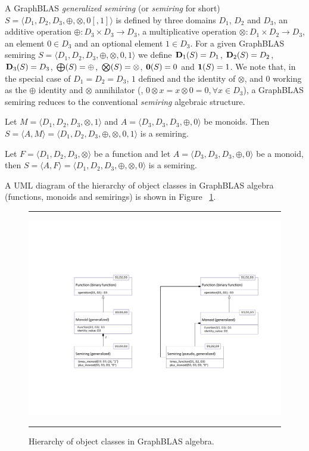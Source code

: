 \documentclass[11pt]{extarticle}
\begin{document}
A GraphBLAS \emph{generalized semiring} (or \emph{semiring} for short)
$S=\langle D_1,D_2,D_3,\oplus,\otimes,0 [,1] \rangle$ is defined by
three domains $D_1$, $D_2$ and $D_3$, an additive operation $\oplus :
D_3 \times D_3 \rightarrow D_3$, 
a multiplicative operation $\otimes : D_1 \times D_2 \rightarrow
D_3$, an element $0 \in D_3$ and an optional element $1 \in D_3$.
For a given GraphBLAS semiring $S=\langle D_1,
D_2, D_3,\oplus,\otimes,0,1 \rangle$ we define $\bold{D}_1(S) = D_1$,
$\bold{D}_2(S) = D_2$, $\bold{D}_3(S) = D_3$, $\bold{\bigoplus}(S) =
\oplus$, $\bold{\bigotimes}(S) = \otimes$, ${\bf 0}(S) = 0$ and ${\bf 1}(S) =
1$. We note that, in the special case of $D_1 = D_2 = D_3$, $1$ defined and the identity of $\otimes$,
and $0$ working as the $\oplus$ identity and $\otimes$ annihilator (\ie, $0 \otimes x = x
\otimes 0 = 0, \forall x \in D_3$), a GraphBLAS semiring reduces to the
conventional \emph{semiring} algebraic structure.

Let $M = \langle D_1,D_2,D_3,\otimes,1 \rangle$ and
$A = \langle D_3,D_3,D_3,\oplus,0 \rangle$ be monoids.
Then $S= \langle A,M \rangle = \langle D_1,D_2,D_3,\oplus,\otimes,0,1 \rangle$
is a semiring.

Let $F = \langle D_1,D_2,D_3,\otimes \rangle$ be a function
and let $A = \langle D_3,D_3,D_3,\oplus,0 \rangle$ be a monoid,
then $S= \langle A,F \rangle = \langle D_1,D_2,D_3,\oplus,\otimes,0 \rangle$
is a semiring.

A UML diagram of the hierarchy of object classes in GraphBLAS
algebra (functions, monoids and semirings) is shown in 
Figure ~\ref{Fig:AlgebraHierarchyProposed}.

\begin{figure}[htb]
\hrule
\begin{center}
\includegraphics[width=1.0\linewidth,trim=0in 2in 0in 2in]{Algebra_Hierarchy_proposed.pdf}
\end{center}
\caption{Hierarchy of object classes in GraphBLAS algebra.}
\label{Fig:AlgebraHierarchyProposed}
\hrule
\end{figure}

\def\IEEEbibitemsep{3pt plus .5pt}


\end{document}
